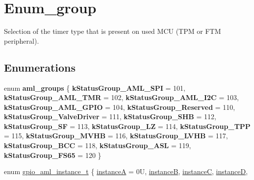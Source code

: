 \hypertarget{group__enum__group}{}\section{Enum\+\_\+group}
\label{group__enum__group}


Selection of the timer type that is present on used M\+CU (T\+PM or F\+TM peripheral).  


\subsection*{Enumerations}
\begin{DoxyCompactItemize}
\item 
\mbox{\label{group__enum__group_ga9397b43bce49e439e9086551951eb555}} 
enum {\bfseries aml\+\_\+groups} \{ \newline
{\bfseries k\+Status\+Group\+\_\+\+A\+M\+L\+\_\+\+S\+PI} = 101, 
{\bfseries k\+Status\+Group\+\_\+\+A\+M\+L\+\_\+\+T\+MR} = 102, 
{\bfseries k\+Status\+Group\+\_\+\+A\+M\+L\+\_\+\+I2C} = 103, 
{\bfseries k\+Status\+Group\+\_\+\+A\+M\+L\+\_\+\+G\+P\+IO} = 104, 
\newline
{\bfseries k\+Status\+Group\+\_\+\+Reserved} = 110, 
{\bfseries k\+Status\+Group\+\_\+\+Valve\+Driver} = 111, 
{\bfseries k\+Status\+Group\+\_\+\+S\+HB} = 112, 
{\bfseries k\+Status\+Group\+\_\+\+SF} = 113, 
\newline
{\bfseries k\+Status\+Group\+\_\+\+LZ} = 114, 
{\bfseries k\+Status\+Group\+\_\+\+T\+PP} = 115, 
{\bfseries k\+Status\+Group\+\_\+\+M\+V\+HB} = 116, 
{\bfseries k\+Status\+Group\+\_\+\+L\+V\+HB} = 117, 
\newline
{\bfseries k\+Status\+Group\+\_\+\+B\+CC} = 118, 
{\bfseries k\+Status\+Group\+\_\+\+A\+SL} = 119, 
{\bfseries k\+Status\+Group\+\_\+\+F\+S65} = 120
 \}
\item 
enum \mbox{\hyperlink{group__enum__group_ga325a66c5aefcf2c26cd0234c7e4bb0ef}{gpio\+\_\+aml\+\_\+instance\+\_\+t}} \{ \newline
\mbox{\hyperlink{group__enum__group_gga325a66c5aefcf2c26cd0234c7e4bb0efa94491042822d871e558aa88223273566}{instanceA}} = 0U, 
\mbox{\hyperlink{group__enum__group_gga325a66c5aefcf2c26cd0234c7e4bb0efa78f5050ddbdfa41568a9e85cd3c732a8}{instanceB}}, 
\mbox{\hyperlink{group__enum__group_gga325a66c5aefcf2c26cd0234c7e4bb0efaa48052cc680e9f75e9933f4c782df496}{instanceC}}, 
\mbox{\hyperlink{group__enum__group_gga325a66c5aefcf2c26cd0234c7e4bb0efa867ccd8588650dbc8d8815973e0462b2}{instanceD}}, 

\end{DoxyCompactItemize}
